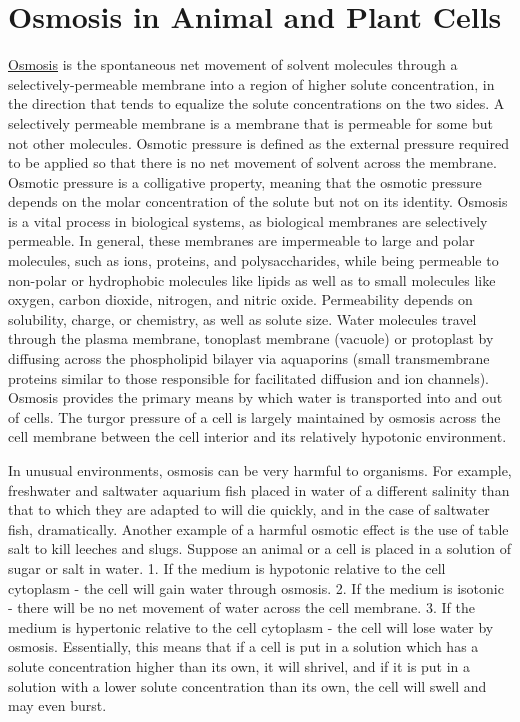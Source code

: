 \section{Osmosis in Animal and Plant
Cells}\label{osmosis-in-animal-and-plant-cells}

\href{https://en.wikipedia.org/wiki/Osmosis}{Osmosis} is the spontaneous
net movement of solvent molecules through a selectively-permeable
membrane into a region of higher solute concentration, in the direction
that tends to equalize the solute concentrations on the two sides. A
selectively permeable membrane is a membrane that is permeable for some
but not other molecules. Osmotic pressure is defined as the external
pressure required to be applied so that there is no net movement of
solvent across the membrane. Osmotic pressure is a colligative property,
meaning that the osmotic pressure depends on the molar concentration of
the solute but not on its identity. Osmosis is a vital process in
biological systems, as biological membranes are selectively permeable.
In general, these membranes are impermeable to large and polar
molecules, such as ions, proteins, and polysaccharides, while being
permeable to non-polar or hydrophobic molecules like lipids as well as
to small molecules like oxygen, carbon dioxide, nitrogen, and nitric
oxide. Permeability depends on solubility, charge, or chemistry, as well
as solute size. Water molecules travel through the plasma membrane,
tonoplast membrane (vacuole) or protoplast by diffusing across the
phospholipid bilayer via aquaporins (small transmembrane proteins
similar to those responsible for facilitated diffusion and ion
channels). Osmosis provides the primary means by which water is
transported into and out of cells. The turgor pressure of a cell is
largely maintained by osmosis across the cell membrane between the cell
interior and its relatively hypotonic environment.

In unusual environments, osmosis can be very harmful to organisms. For
example, freshwater and saltwater aquarium fish placed in water of a
different salinity than that to which they are adapted to will die
quickly, and in the case of saltwater fish, dramatically. Another
example of a harmful osmotic effect is the use of table salt to kill
leeches and slugs. Suppose an animal or a cell is placed in a solution
of sugar or salt in water. 1. If the medium is hypotonic relative to the
cell cytoplasm - the cell will gain water through osmosis. 2. If the
medium is isotonic - there will be no net movement of water across the
cell membrane. 3. If the medium is hypertonic relative to the cell
cytoplasm - the cell will lose water by osmosis. Essentially, this means
that if a cell is put in a solution which has a solute concentration
higher than its own, it will shrivel, and if it is put in a solution
with a lower solute concentration than its own, the cell will swell and
may even burst.

